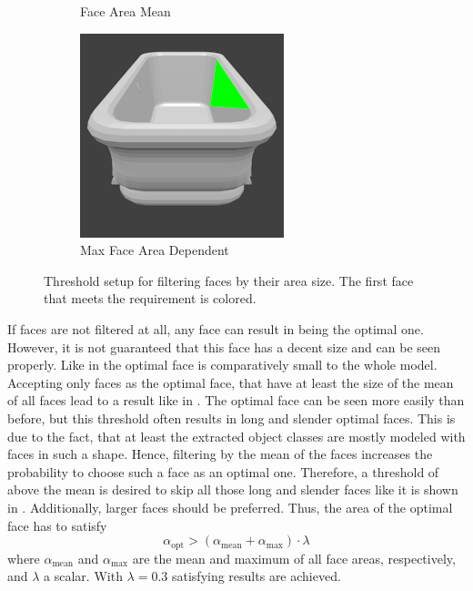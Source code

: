 \begin{figure}
\begin{subfigure}{.32\textwidth}
		\caption{Face Area Mean}
		\label{fig:face-area-mean}
	\end{subfigure}
	\begin{subfigure}{.32\textwidth}
		\centering
		\includegraphics[width=\textwidth]{images/face_area_max_dependent.png}
		\caption{Max Face Area Dependent}
		\label{fig:face-area-max-dependent}
	\end{subfigure}
	\caption[Threshold setup for filtering faces by their area size]{Threshold setup for filtering faces by their area size. The first face that meets the requirement is colored.}
	\label{fig:face-area-filter}
\end{figure}
If faces are not filtered at all, any face can result in being the optimal one.
However, it is not guaranteed that this face has a decent size and can be seen properly.
Like in  the optimal face is comparatively small to the whole model.
Accepting only faces as the optimal face, that have at least the size of the mean of all faces lead to a result like in .
The optimal face can be seen more easily than before, but this threshold often results in long and slender optimal faces.
This is due to the fact, that at least the extracted object classes are mostly modeled with faces in such a shape.
Hence, filtering by the mean of the faces increases the probability to choose such a face as an optimal one.
Therefore, a threshold of above the mean is desired to skip all those long and slender faces like it is shown in .
Additionally, larger faces should be preferred.
Thus, the area of the optimal face has to satisfy
\begin{equation}
	\alpha_{\text{opt}} > (\alpha_{\text{mean}} + \alpha_{\text{max}}) \cdot \lambda
\end{equation}
where $\alpha_{\text{mean}}$ and $\alpha_{\text{max}}$ are the mean and maximum of all face areas, respectively, and $\lambda$ a scalar.
With $\lambda = 0.3$ satisfying results are achieved.

